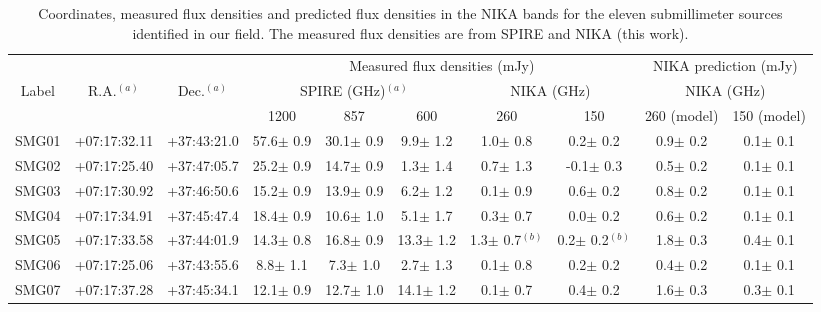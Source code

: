 \documentclass[twocolumn,traditabstract]{aa}
\begin{document}
\begin{table}[h]
\caption{\footnotesize{Coordinates, measured flux densities and predicted flux densities in the NIKA bands for the eleven submillimeter sources identified in our field. The measured flux densities are from SPIRE \citep{Sayers2013} and NIKA (this work).}}
\begin{center}
\begin{tabular}{c|cc|ccc|cc|cc}
\hline
\hline
 & & & \multicolumn{5}{c}{Measured flux densities (mJy)} & \multicolumn{2}{c}{NIKA prediction (mJy)} \\
Label & R.A.$^{(a)}$ & Dec.$^{(a)}$ & \multicolumn{3}{c}{SPIRE (GHz)$^{(a)}$} & \multicolumn{2}{c}{NIKA (GHz)} & \multicolumn{2}{c}{NIKA (GHz)} \\
 &  &  & 1200 & 857 & 600 & 260 & 150 & 260 (model) & 150 (model) \\
 \hline
SMG01 & +07:17:32.11 & +37:43:21.0 &     57.6$\pm$     0.9 &     30.1$\pm$     0.9 &      9.9$\pm$     1.2 &      1.0$\pm$     0.8 &      0.2$\pm$     0.2 &      0.9$\pm$     0.2 &      0.1$\pm$     0.1 \\ 
SMG02 & +07:17:25.40 & +37:47:05.7 &     25.2$\pm$     0.9 &     14.7$\pm$     0.9 &      1.3$\pm$     1.4 &      0.7$\pm$     1.3 &     -0.1$\pm$     0.3 &      0.5$\pm$     0.2 &      0.1$\pm$     0.1 \\ 
SMG03 & +07:17:30.92 & +37:46:50.6 &     15.2$\pm$     0.9 &     13.9$\pm$     0.9 &      6.2$\pm$     1.2 &      0.1$\pm$     0.9 &      0.6$\pm$     0.2 &      0.8$\pm$     0.2 &      0.1$\pm$     0.1 \\ 
SMG04 & +07:17:34.91 & +37:45:47.4 &     18.4$\pm$     0.9 &     10.6$\pm$     1.0 &      5.1$\pm$     1.7 &      0.3$\pm$     0.7 &      0.0$\pm$     0.2 &      0.6$\pm$     0.2 &      0.1$\pm$     0.1 \\ 
SMG05 & +07:17:33.58 & +37:44:01.9 &     14.3$\pm$     0.8 &     16.8$\pm$     0.9 &     13.3$\pm$     1.2 &      1.3$\pm$     0.7$^{(b)}$ &      0.2$\pm$     0.2$^{(b)}$ &      1.8$\pm$     0.3 &      0.4$\pm$     0.1 \\ 
SMG06 & +07:17:25.06 & +37:43:55.6 &      8.8$\pm$     1.1 &      7.3$\pm$     1.0 &      2.7$\pm$     1.3 &      0.1$\pm$     0.8 &      0.2$\pm$     0.2 &      0.4$\pm$     0.2 &      0.1$\pm$     0.1 \\ 
SMG07 & +07:17:37.28 & +37:45:34.1 &     12.1$\pm$     0.9 &     12.7$\pm$     1.0 &     14.1$\pm$     1.2 &      0.1$\pm$     0.7 &      0.4$\pm$     0.2 &      1.6$\pm$     0.3 &      0.3$\pm$     0.1 \\ 

\end{tabular}
\end{center}
\end{table}
\end{document}
